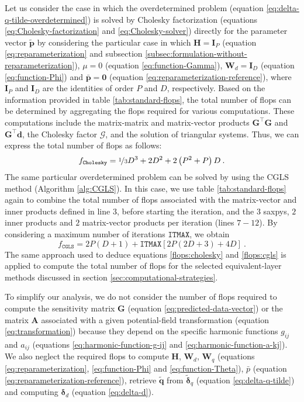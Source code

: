 Let us consider the case in which the overdetermined problem
(equation \ref{eq:delta-q-tilde-overdetermined}) is solved by Cholesky factorization (equations \ref{eq:Cholesky-factorization} and \ref{eq:Cholesky-solver})
directly for the parameter vector $\tilde{\mathbf{p}}$ by considering 
the particular case in which $\mathbf{H} = \mathbf{I}_{P}$ (equation \ref{eq:reparameterization} and 
subsection \ref{subsec:formulation-without-reparameterization}),
$\mu = 0$ (equation \ref{eq:function-Gamma}), 
$\mathbf{W}_{d} = \mathbf{I}_{D}$ (equation \ref{eq:function-Phi}) and
$\bar{\mathbf{p}} = \mathbf{0}$ (equation \ref{eq:reparameterization-reference}), 
where $\mathbf{I}_{P}$ and $\mathbf{I}_{D}$ are the identities of order $P$ and $D$, respectively.
Based on the information provided in table \ref{tab:standard-flops}, the total number of flops can be determined by aggregating the flops required for various computations. These computations include the matrix-matrix and matrix-vector products $\mathbf{G}^{\top}\mathbf{G}$ and $\mathbf{G}^{\top}\mathbf{d}$, 
the Cholesky factor $\boldsymbol{\mathcal{G}}$, and the solution of triangular systems. Thus, we can express the total number of flops as follows:
\begin{equation}
	f_{\mathtt{Cholesky}} = \nicefrac{1}{3}D^{3} + 2 D^{2} + 2 \left( P^{2} + P \right) D \: .
	\label{flops:cholesky}
\end{equation}
The same particular overdetermined problem can be solved by using the CGLS method (Algorithm \ref{alg:CGLS}).
In this case, we use table \ref{tab:standard-flops} again to combine the total number of
flops associated with the matrix-vector and inner products defined in line 3, before 
starting the iteration, and the $3$ saxpys, $2$ inner products and $2$ matrix-vector products
per iteration (lines $7-12$). By considering a maximum number of iterations $\mathtt{ITMAX}$, we obtain
\begin{equation}
	f_{\mathtt{CGLS}} = 2P(D+1) + \mathtt{ITMAX} \left[ 2P \left( 2D + 3 \right) + 4D \right] \: .
	\label{flops:cgls}
\end{equation}
The same approach used to deduce equations \ref{flops:cholesky} and \ref{flops:cgls} is
applied to compute the total number of flops for the selected equivalent-layer 
methods discussed in section \ref{sec:computational-strategies}.

To simplify our analysis, we do not consider the number of flops required to compute the sensitivity matrix 
$\mathbf{G}$ (equation \ref{eq:predicted-data-vector}) or the matrix $\mathbf{A}$ associated with a given
potential-field transformation (equation \ref{eq:transformation})
because they depend on the specific harmonic functions $g_{ij}$ and $a_{ij}$
(equations \ref{eq:harmonic-function-g-ij} and \ref{eq:harmonic-function-a-kj}).
We also neglect the required flops to compute $\mathbf{H}$, $\mathbf{W}_{d}$, $\mathbf{W}_{q}$ 
(equations \ref{eq:reparameterization}, \ref{eq:function-Phi} and \ref{eq:function-Theta}), 
$\bar{p}$ (equation \ref{eq:reparameterization-reference}), 
retrieve $\tilde{\mathbf{q}}$ from $\tilde{\boldsymbol{\delta}}_{q}$ (equation \ref{eq:delta-q-tilde}) and computing
$\boldsymbol{\delta}_{d}$ (equation \ref{eq:delta-d}).


